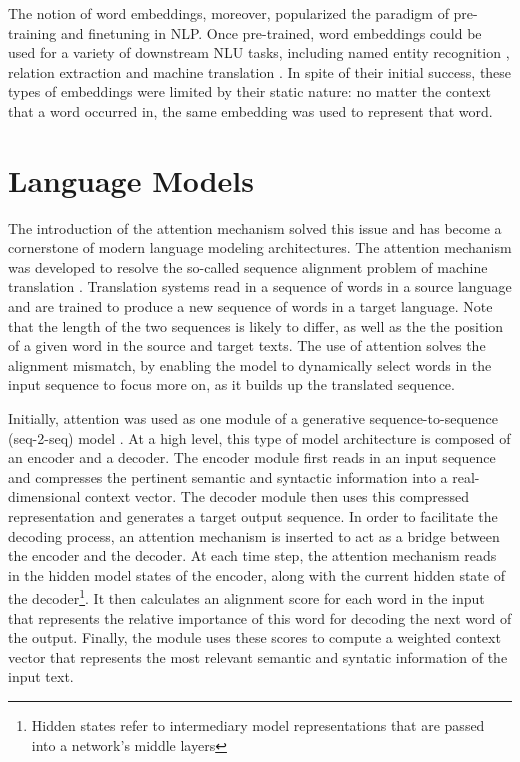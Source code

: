 The notion of word embeddings, moreover, popularized the paradigm of pre-training and finetuning in NLP. Once pre-trained, word embeddings could be used for a variety of downstream NLU tasks, including named entity recognition \citep{lample2016neural}, relation extraction \citep{nguyen2015relation} and machine translation \citep{qi-etal-2018-pre}. In spite of their initial success, these types of embeddings were limited by their static nature: no matter the context that a word occurred in, the same embedding was used to represent that word. 


\section{Language Models}

The introduction of the attention mechanism solved this issue and has become a cornerstone of modern language modeling architectures. The attention mechanism was developed to resolve the so-called sequence alignment problem of machine translation \citep{bahdanau2014neural,luong2015effective}. Translation systems read in a sequence of words in a source language and are trained to produce a new sequence of words in a target language. Note that the length of the two sequences is likely to differ, as well as the the position of a given word in the source and target texts. The use of attention solves the alignment mismatch, by enabling the model to dynamically select words in the input sequence to focus more on, as it builds up the translated sequence. 

Initially, attention was used as one module of a generative sequence-to-sequence (seq-2-seq) model \citep{sutskever2014sequence}. At a high level, this type of model architecture is composed of an encoder and a decoder. The encoder module first reads in an input sequence and compresses the pertinent semantic and syntactic information into a real-dimensional context vector. The decoder module then uses this compressed representation and generates a target output sequence. In order to facilitate the decoding process, an attention mechanism is inserted to act as a bridge between the encoder and the decoder. At each time step, the attention mechanism reads in the hidden model states of the encoder, along with the current hidden state of the decoder\footnote{Hidden states refer to intermediary model representations that are passed into a network's middle layers}. It then calculates an alignment score for each word in the input that represents the relative importance of this word for decoding the next word of the output. Finally, the module uses these scores to compute a weighted context vector that represents the most relevant semantic and syntatic information of the input text.

